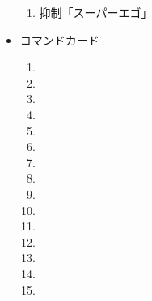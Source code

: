 \documentclass[line_length=22zw,number_of_lines=45,twocolumn]{jlreq}
\begin{document}
\begin{itemize}
\begin{enumerate}
			\item 抑制「スーパーエゴ」
		\end{enumerate}
	\item コマンドカード
		\begin{enumerate}
			\item 
			\item 
			\item 
			\item 
			\item 
			\item 
			\item 
			\item 
			\item 
			\item 
			\item 
			\item 
			\item 
			\item 
			\item 
		\end{enumerate}
\end{itemize}
\pagebreak
\end{document}
